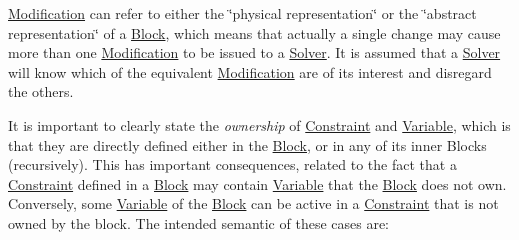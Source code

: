 \mbox{\hyperlink{class_s_m_spp__di__unipi__it_1_1_modification}{Modification}} can refer to either the \char`\"{}physical representation\char`\"{} or the \char`\"{}abstract
representation\char`\"{} of a \mbox{\hyperlink{class_s_m_spp__di__unipi__it_1_1_block}{Block}}, which means that actually a single change may cause more than one \mbox{\hyperlink{class_s_m_spp__di__unipi__it_1_1_modification}{Modification}} to be issued to a \mbox{\hyperlink{class_s_m_spp__di__unipi__it_1_1_solver}{Solver}}. It is assumed that a \mbox{\hyperlink{class_s_m_spp__di__unipi__it_1_1_solver}{Solver}} will know which of the equivalent \mbox{\hyperlink{class_s_m_spp__di__unipi__it_1_1_modification}{Modification}} are of its interest and disregard the others.

It is important to clearly state the {\itshape ownership} of \mbox{\hyperlink{class_s_m_spp__di__unipi__it_1_1_constraint}{Constraint}} and \mbox{\hyperlink{class_s_m_spp__di__unipi__it_1_1_variable}{Variable}}, which is that they are directly defined either in the \mbox{\hyperlink{class_s_m_spp__di__unipi__it_1_1_block}{Block}}, or in any of its inner Blocks (recursively). This has important consequences, related to the fact that a \mbox{\hyperlink{class_s_m_spp__di__unipi__it_1_1_constraint}{Constraint}} defined in a \mbox{\hyperlink{class_s_m_spp__di__unipi__it_1_1_block}{Block}} may contain \mbox{\hyperlink{class_s_m_spp__di__unipi__it_1_1_variable}{Variable}} that the \mbox{\hyperlink{class_s_m_spp__di__unipi__it_1_1_block}{Block}} does not own. Conversely, some \mbox{\hyperlink{class_s_m_spp__di__unipi__it_1_1_variable}{Variable}} of the \mbox{\hyperlink{class_s_m_spp__di__unipi__it_1_1_block}{Block}} can be active in a \mbox{\hyperlink{class_s_m_spp__di__unipi__it_1_1_constraint}{Constraint}} that is not owned by the block. The intended semantic of these cases are\+:


